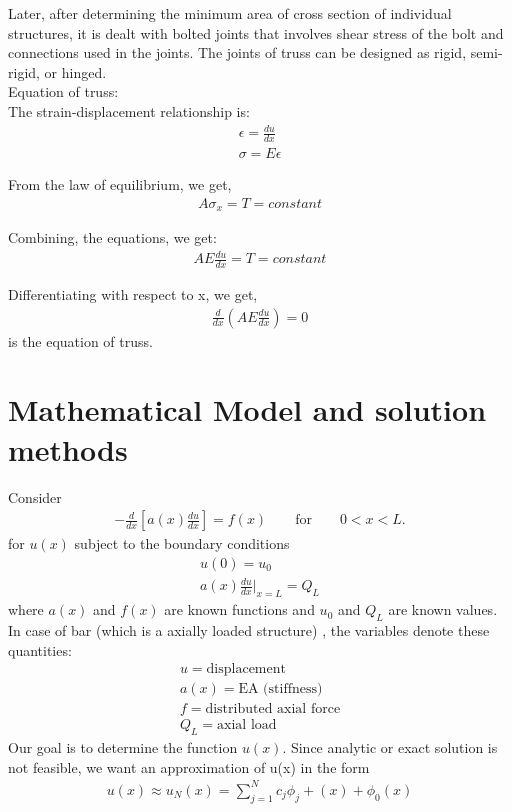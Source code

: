 Later, after determining the minimum area of cross section of individual structures, it is dealt with bolted joints that involves shear stress of the bolt and connections used in the joints. The joints of truss can be designed as rigid, semi-rigid, or hinged.\\

Equation of truss: \\

The strain-displacement relationship is: \\
\begin{eqnarray}
	\epsilon = \frac{du}{dx}\\
	\sigma = E\epsilon
\end{eqnarray}

From the law of equilibrium, we get,
\begin{eqnarray}
	A\sigma_x = T = constant
\end{eqnarray}

Combining, the equations, we get:
\begin{eqnarray}
	AE\frac{du}{dx} = T = constant
\end{eqnarray}

Differentiating with respect to x, we get,
\begin{eqnarray}
	\frac{d}{dx}(AE\frac{du}{dx}) = 0
\end{eqnarray}
is the equation of truss.

\pagebreak
\section{\bf{Mathematical Model and solution methods}}

Consider\\
\begin{eqnarray}
	-\frac{d}{dx} \left[a(x)\frac{du}{dx} \right] = f(x)  \quad\quad  \text{for} \quad\quad  0<x<L.
\end{eqnarray}
for $u(x)$ subject to the boundary conditions\\
\begin{eqnarray}
	u(0)= u_0 \\
	a(x)\frac{du}{dx}\biggr|_{x=L} = Q_L	
\end{eqnarray}
where $a(x)$ and $f(x)$ are known functions and 
$u_0$ and $Q_L$ are known values.
In case of bar (which is a axially loaded structure) , the variables denote these quantities:
\begin{eqnarray*}
	u = \text{displacement}\\
	a(x)= \text{EA (stiffness)}\\
	f = \text{distributed axial force}\\
	Q_L= \text{axial load}
\end{eqnarray*}
Our goal is to determine the function $u(x)$. Since analytic or exact solution is not feasible, we want an approximation of u(x) in the form
\begin{eqnarray}\label{approxfunc}\label{approxsoln}
	u(x)\approx u_N(x) = \sum\limits_{j=1}^N c_j\phi_{j} + (x) +\phi_{0}(x)
\end{eqnarray}

